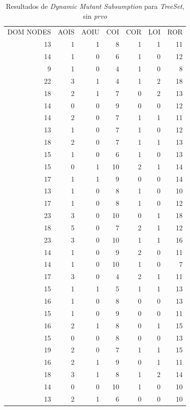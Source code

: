 \begin{table}[]
	\caption{Resultados de \emph{Dynamic Mutant Subsumption} para \emph{TreeSet}, sin \emph{prvo}}
	\label{tables.results.subsumption.treeset.noprvo}
	\centering
	\scriptsize
	\def\arraystretch{0.95}
	\setlength\tabcolsep{0.5mm}
	\begin{tabular}{rrrrrrr}
		DOM NODES & AOIS & AOIU & COI & COR & LOI & ROR \\
		13 & 1 & 1 & 8 & 1 & 1 & 11 \\
		14 & 1 & 0 & 6 & 1 & 0 & 12 \\
		9 & 1 & 0 & 4 & 1 & 0 & 8 \\
		22 & 3 & 1 & 4 & 1 & 2 & 18 \\
		18 & 2 & 1 & 7 & 0 & 2 & 13 \\
		14 & 0 & 0 & 9 & 0 & 0 & 12 \\
		14 & 2 & 0 & 7 & 1 & 1 & 11 \\
		13 & 1 & 0 & 7 & 1 & 0 & 12 \\
		18 & 2 & 0 & 7 & 1 & 1 & 13 \\
		15 & 1 & 0 & 6 & 1 & 0 & 13 \\
		15 & 0 & 1 & 10 & 2 & 1 & 14 \\
		17 & 1 & 1 & 9 & 0 & 0 & 14 \\
		13 & 1 & 0 & 8 & 1 & 0 & 10 \\
		17 & 1 & 0 & 8 & 1 & 0 & 12 \\
		23 & 3 & 0 & 10 & 0 & 1 & 18 \\
		18 & 5 & 0 & 7 & 2 & 1 & 12 \\
		23 & 3 & 0 & 10 & 1 & 1 & 16 \\
		14 & 1 & 0 & 9 & 2 & 0 & 11 \\
		14 & 1 & 0 & 10 & 1 & 0 & 7 \\
		17 & 3 & 0 & 4 & 2 & 1 & 11 \\
		15 & 1 & 1 & 5 & 1 & 1 & 13 \\
		16 & 1 & 0 & 8 & 0 & 0 & 13 \\
		15 & 1 & 0 & 9 & 0 & 0 & 11 \\
		16 & 2 & 1 & 8 & 0 & 1 & 15 \\
		15 & 0 & 0 & 8 & 0 & 0 & 13 \\
		19 & 2 & 0 & 7 & 1 & 1 & 15 \\
		16 & 2 & 1 & 9 & 0 & 1 & 11 \\
		18 & 3 & 1 & 8 & 1 & 2 & 14 \\
		14 & 0 & 0 & 10 & 1 & 0 & 10 \\
		13 & 2 & 1 & 6 & 0 & 0 & 10
	\end{tabular}
\end{table}

